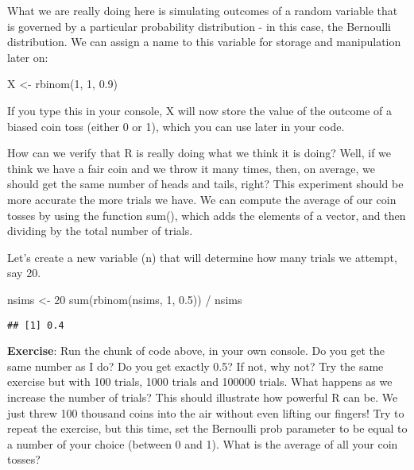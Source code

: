 \documentclass[
]{book}
\newenvironment{Shaded}{\begin{snugshade}}{\end{snugshade}}
\newcommand{\DecValTok}[1]{\textcolor[rgb]{0.00,0.00,0.81}{#1}}
\newcommand{\FloatTok}[1]{\textcolor[rgb]{0.00,0.00,0.81}{#1}}
\newcommand{\FunctionTok}[1]{\textcolor[rgb]{0.00,0.00,0.00}{#1}}
\newcommand{\NormalTok}[1]{#1}
\newcommand{\OtherTok}[1]{\textcolor[rgb]{0.56,0.35,0.01}{#1}}
\newcommand{\SpecialCharTok}[1]{\textcolor[rgb]{0.00,0.00,0.00}{#1}}
\begin{document}
What we are really doing here is simulating outcomes of a random variable that is governed by a particular probability distribution - in this case, the Bernoulli distribution. We can assign a name to this variable for storage and manipulation later on:

\begin{Shaded}
\begin{Highlighting}[]
\NormalTok{X }\OtherTok{\textless{}{-}} \FunctionTok{rbinom}\NormalTok{(}\DecValTok{1}\NormalTok{, }\DecValTok{1}\NormalTok{, }\FloatTok{0.9}\NormalTok{)}
\end{Highlighting}
\end{Shaded}

If you type this in your console, X will now store the value of the outcome of a biased coin toss (either 0 or 1), which you can use later in your code.

How can we verify that R is really doing what we think it is doing? Well, if we think we have a fair coin and we throw it many times, then, on average, we should get the same number of heads and tails, right? This experiment should be more accurate the more trials we have. We can compute the average of our coin tosses by using the function sum(), which adds the elements of a vector, and then dividing by the total number of trials.

Let's create a new variable (n) that will determine how many trials we attempt, say 20.

\begin{Shaded}
\begin{Highlighting}[]
\NormalTok{nsims }\OtherTok{\textless{}{-}} \DecValTok{20}
\FunctionTok{sum}\NormalTok{(}\FunctionTok{rbinom}\NormalTok{(nsims, }\DecValTok{1}\NormalTok{, }\FloatTok{0.5}\NormalTok{)) }\SpecialCharTok{/}\NormalTok{ nsims}
\end{Highlighting}
\end{Shaded}

\begin{verbatim}
## [1] 0.4
\end{verbatim}

\textbf{Exercise}: Run the chunk of code above, in your own console. Do you get the same number as I do? Do you get exactly 0.5? If not, why not? Try the same exercise but with 100 trials, 1000 trials and 100000 trials. What happens as we increase the number of trials? This should illustrate how powerful R can be. We just threw 100 thousand coins into the air without even lifting our fingers! Try to repeat the exercise, but this time, set the Bernoulli prob parameter to be equal to a number of your choice (between 0 and 1). What is the average of all your coin tosses?
\end{document}
